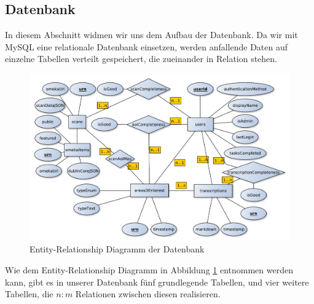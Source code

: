 \documentclass{article}
\begin{document}
\subsection{Datenbank}
In diesem Abschnitt widmen wir uns dem Aufbau der Datenbank.
Da wir mit MySQL eine relationale Datenbank einsetzen,
werden anfallende Daten auf einzelne Tabellen verteilt gespeichert,
die zueinander in Relation stehen.
\begin{figure}[H]
\includegraphics[width=\textwidth]{../notes/ER.pdf}
\caption{Entity-Relationship Diagramm der Datenbank}
\label{fig:er}
\end{figure}
Wie dem Entity-Relationship Diagramm in Abbildung \ref{fig:er} entnommen werden kann,
gibt es in unserer Datenbank fünf grundlegende Tabellen,
und vier weitere Tabellen,
die $n:m$ Relationen zwischen diesen realisieren.
\end{document}
